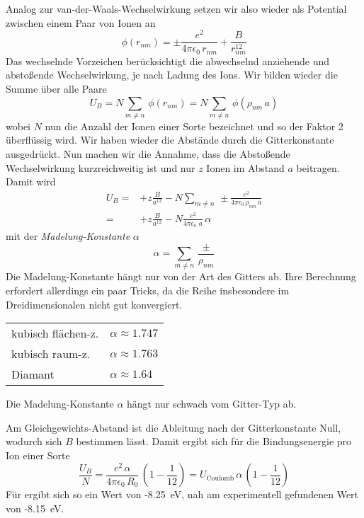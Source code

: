 Analog zur van-der-Waals-Wechselwirkung setzen wir also wieder als Potential zwischen einem Paar von Ionen an
\begin{equation}
 \phi(r_{nm}) = \pm \frac{e^2}{4 \pi \epsilon_0 \, r_{nm}} + \frac{B}{ r_{nm}^{12}}
\end{equation}
Das wechselnde Vorzeichen berücksichtigt die abwechselnd anziehende und abstoßende Wechselwirkung, je nach Ladung des Ions. Wir bilden wieder die Summe über alle Paare
\begin{equation}
U_B = N \sum_{m \neq n} \, \phi(r_{nm})  = N \sum_{m \neq n} \, \phi(\rho_{nm} \, a) 
\end{equation}
wobei $N$ nun die Anzahl der Ionen einer Sorte bezeichnet und so der Faktor 2 überflüssig wird. Wir haben wieder die Abstände durch die Gitterkonstante ausgedrückt. Nun machen wir die Annahme, dass die Abstoßende Wechselwirkung kurzreichweitig ist und nur $z$ Ionen im Abstand $a$ beitragen. Damit wird  
\begin{align}
U_B = & + z \frac{ B}{ a^{12}} - N \sum_{m \neq n} \, \pm \frac{e^2}{4 \pi \epsilon_0 \, \rho_{nm} \, a}  \\
= & + z \frac{ B}{ a^{12}} - N \frac{e^2}{4 \pi \epsilon_0 \,  \, a}  \, \alpha
\end{align}
mit der \emph{Madelung-Konstante} $\alpha$
\begin{equation}
 \alpha = \sum_{m \neq n} \, \frac{\pm}{\rho_{nm} }  
\end{equation}
Die Madelung-Konstante hängt nur von der Art des Gitters ab. Ihre Berechnung erfordert allerdings ein paar Tricks, da die Reihe insbesondere im Dreidimensionalen nicht gut konvergiert. 

\begin{marginfigure}

\begin{tabular}{ll}
kubisch flächen-z. & $\alpha \approx 1.747$ \\
kubisch raum-z. & $\alpha \approx 1.763$ \\
Diamant & $\alpha \approx 1.64$ \\
\end{tabular}
\caption{Die Madelung-Konstante $\alpha$ hängt nur schwach vom Gitter-Typ ab.}
\end{marginfigure}

Am Gleichgewichts-Abstand ist die Ableitung nach der Gitterkonstante Null, wodurch sich $B$ bestimmen lässt. Damit ergibt sich für die Bindungsenergie pro Ion einer Sorte
\begin{equation}
\frac{U_B}{N} = \frac{e^2 \, \alpha }{4 \pi \epsilon_0 \, R_0} \, \left( 1- \frac{1}{12} \right) = U_\text{Coulomb} \, \alpha \, \left( 1- \frac{1}{12} \right) 
\end{equation}
Für  ergibt sich so ein Wert von -8.25~eV, nah am experimentell gefundenen Wert von -8.15~eV.


